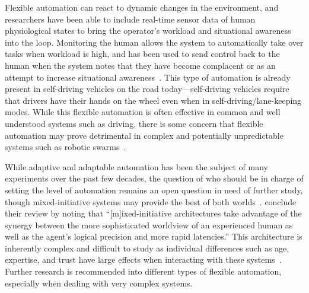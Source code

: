 Flexible automation can react to dynamic changes in the environment, and researchers have been able to include real-time sensor data of human physiological states to bring the operator's workload and situational awareness into the loop.
Monitoring the human allows the system to automatically take over tasks when workload is high, and has been used to send control back to the human when the system notes that they have become complacent or as an attempt to increase situational awareness~\citep{lu_human_2016}.
This type of automation is already present in self-driving vehicles on the road today—self-driving vehicles require that drivers have their hands on the wheel even when in self-driving/lane-keeping modes.
While this flexible automation is often effective in common and well understood systems such as driving, there is some concern that flexible automation may prove detrimental in complex and potentially unpredictable systems such as robotic swarms~\citep{kolling_human_2016}.

While adaptive and adaptable automation has been the subject of many experiments over the past few decades, the question of who should be in charge of setting the level of automation remains an open question in need of further study, though mixed-initiative systems may provide the best of both worlds~\citep{parasuraman_humans:_2008, chen_humanagent_2014}.
\citeauthor{chen_humanagent_2014} conclude their review by noting that ``[m]ixed-initiative architectures take advantage of the synergy between the more sophisticated worldview of an experienced human as well as the agent's logical precision and more rapid latencies.''
This architecture is inherently complex and difficult to study as individual differences such as age, expertise, and trust have large effects when interacting with these systems~\citep{schaefer_meta-analysis_2016}.
Further research is recommended into different types of flexible automation, especially when dealing with very complex systems.

